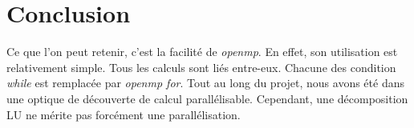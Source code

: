 \documentclass[10pt,a4paper]{article}
\begin{document}
\section*{Conclusion}
\hypertarget{Conclusion}{}

Ce que l'on peut retenir, c'est la facilité de \textit{openmp}. En effet, son utilisation est relativement simple. Tous les calculs sont liés entre-eux. Chacune des condition \textit{while} est remplacée par \textit{openmp for}. Tout au long du projet, nous avons été dans une optique de découverte de calcul parallélisable. Cependant, une décomposition LU ne mérite pas forcément une parallélisation. 
\end{document}
